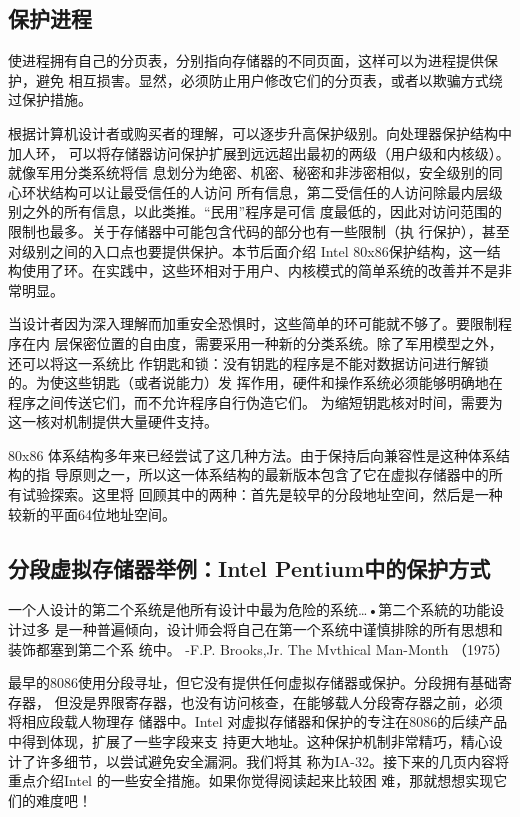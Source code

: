 \subsection{保护进程}
使进程拥有自己的分页表，分别指向存储器的不同页面，这样可以为进程提供保护，避免
相互损害。显然，必须防止用户修改它们的分页表，或者以欺骗方式绕过保护措施。

根据计算机设计者或购买者的理解，可以逐步升高保护级别。向处理器保护结构中加人环，
可以将存储器访问保护扩展到远远超出最初的两级（用户级和内核级）。就像军用分类系统将信
息划分为绝密、机密、秘密和非涉密相似，安全级别的同心环状结构可以让最受信任的人访问
所有信息，第二受信任的人访问除最内层级别之外的所有信息，以此类推。“民用”程序是可信
度最低的，因此对访问范围的限制也最多。关于存储器中可能包含代码的部分也有一些限制（执
行保护），甚至对级别之间的入口点也要提供保护。本节后面介绍 Intel 80x86保护结构，这一结
构使用了环。在实践中，这些环相对于用户、内核模式的简单系统的改善并不是非常明显。

当设计者因为深入理解而加重安全恐惧时，这些简单的环可能就不够了。要限制程序在内
层保密位置的自由度，需要采用一种新的分类系统。除了军用模型之外，还可以将这一系统比
作钥匙和锁：没有钥匙的程序是不能对数据访问进行解锁的。为使这些钥匙（或者说能力）发
挥作用，硬件和操作系统必须能够明确地在程序之间传送它们，而不允许程序自行伪造它们。
为缩短钥匙核对时间，需要为这一核对机制提供大量硬件支持。

80x86 体系结构多年来已经尝试了这几种方法。由于保持后向兼容性是这种体系结构的指
导原则之一，所以这一体系结构的最新版本包含了它在虚拟存储器中的所有试验探索。这里将
回顾其中的两种：首先是较早的分段地址空间，然后是一种较新的平面64位地址空间。

\subsection{分段虚拟存储器举例：Intel Pentium中的保护方式}

一个人设计的第二个系统是他所有设计中最为危险的系统…•第二个系統的功能设计过多
是一种普遍倾向，设计师会将自己在第一个系统中谨慎排除的所有思想和装饰都塞到第二个系
统中。
-F.P. Brooks,Jr.
The Mvthical Man-Month （1975）

最早的8086使用分段寻址，但它没有提供任何虚拟存储器或保护。分段拥有基础寄存器，
但没是界限寄存器，也没有访问核查，在能够载人分段寄存器之前，必须将相应段载人物理存
储器中。Intel 对虚拟存储器和保护的专注在8086的后续产品中得到体现，扩展了一些字段来支
持更大地址。这种保护机制非常精巧，精心设计了许多细节，以尝试避免安全漏洞。我们将其
称为IA-32。接下来的几页内容将重点介绍Intel 的一些安全措施。如果你觉得阅读起来比较困
难，那就想想实现它们的难度吧！


